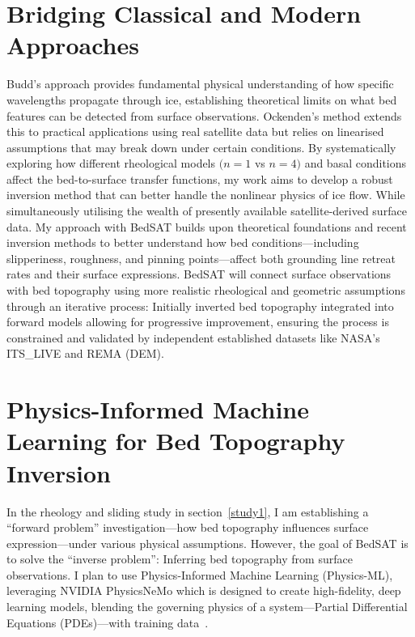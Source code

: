 \section{Bridging Classical and Modern Approaches}
Budd's approach provides fundamental physical understanding of how specific wavelengths propagate through ice, establishing theoretical limits on what bed features can be detected from surface observations. Ockenden's method extends this to practical applications using real satellite data but relies on linearised assumptions that may break down under certain conditions. By systematically exploring how different rheological models $(n = 1$ vs $n = 4)$ and basal conditions affect the bed-to-surface transfer functions, my work aims to develop a robust inversion method that can better handle the nonlinear physics of ice flow.
While simultaneously utilising the wealth of presently available satellite-derived surface data. My approach with BedSAT builds upon theoretical foundations and recent inversion methods to better understand how bed conditions—including slipperiness, roughness, and pinning points—affect both grounding line retreat rates and their surface expressions. BedSAT will connect surface observations with bed topography using more realistic rheological and geometric assumptions through an iterative process: Initially inverted bed topography integrated into forward models allowing for progressive improvement, ensuring the process is constrained and validated by independent established datasets like NASA's ITS\_LIVE and REMA (DEM).

\section{Physics-Informed Machine Learning for Bed Topography Inversion}\label{ML}
In the rheology and sliding study in section~\ref{study1}, I am establishing a ``forward problem'' investigation—how bed topography influences surface expression—under various physical assumptions. However, the goal of BedSAT is to solve the ``inverse problem'': Inferring bed topography from surface observations. I plan to use Physics-Informed Machine Learning (Physics-ML), leveraging NVIDIA PhysicsNeMo which is designed to create high-fidelity, deep learning models, blending the governing physics of a system—Partial Differential Equations (PDEs)—with training data~\cite{NVIDIA_NeMo_2025}. 

